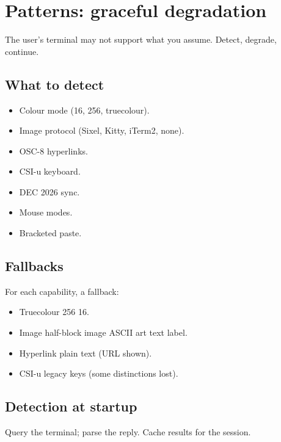 \chapter{Patterns: graceful degradation}
\label{ch:degradation}

\begin{aside}
The user's terminal may not support what you assume. Detect,
degrade, continue.
\end{aside}

\section{What to detect}

\begin{itemize}[leftmargin=*]
  \item Colour mode (16, 256, truecolour).
  \item Image protocol (Sixel, Kitty, iTerm2, none).
  \item OSC-8 hyperlinks.
  \item CSI-u keyboard.
  \item DEC 2026 sync.
  \item Mouse modes.
  \item Bracketed paste.
\end{itemize}

\section{Fallbacks}

For each capability, a fallback:

\begin{itemize}[leftmargin=*]
  \item Truecolour \textrightarrow{} 256 \textrightarrow{}
    16.
  \item Image \textrightarrow{} half-block image
    \textrightarrow{} ASCII art \textrightarrow{} text
    label.
  \item Hyperlink \textrightarrow{} plain text (URL shown).
  \item CSI-u \textrightarrow{} legacy keys (some
    distinctions lost).
\end{itemize}

\section{Detection at startup}

Query the terminal; parse the reply. Cache results for the
session.

